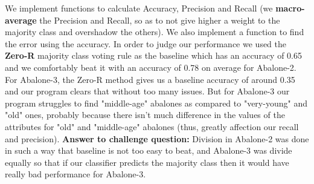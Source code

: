 We implement functions to calculate Accuracy, Precision and Recall (we {\bf macro-average} the Precision and Recall, so as to not give higher a weight to the majority class and overshadow the others). We also implement a function to find the error using the accuracy. In order to judge our performance we used the {\bf Zero-R} majority class voting rule as the baseline which has an accuracy of 0.65 and we comfortably beat it with an accuracy of 0.78 on average for Abalone-2. For Abalone-3, the Zero-R method gives us a baseline accuracy of around 0.35 and our program clears that without too many issues. But for Abalone-3 our program struggles to find "middle-age" abalones as compared to "very-young" and "old" ones, probably because there isn't much difference in the values of the attributes for "old" and "middle-age" abalones (thus, greatly affection our recall and precision). {\bf Answer to challenge question:} Division in Abalone-2 was done in such a way that baseline is not too easy to beat, and Abalone-3 was divide equally so that if our classifier predicts the majority class then it would have really bad performance for Abalone-3. 

